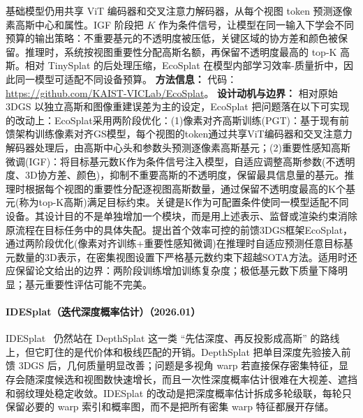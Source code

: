 基础模型仍用共享 ViT 编码器和交叉注意力解码器，从每个视图 token 预测逐像素高斯中心和属性。IGF 阶段把 $K$ 作为条件信号，让模型在同一输入下学会不同预算的输出策略：不重要基元的不透明度被压低，关键区域的协方差和颜色被保留。推理时，系统按视图重要性分配高斯名额，再保留不透明度最高的 top-K 高斯。相对 TinySplat 的后处理压缩，EcoSplat 在模型内部学习效率-质量折中，因此同一模型可适配不同设备预算。
\textbf{方法信息：} 代码：\url{https://github.com/KAIST-VICLab/EcoSplat}。
\textbf{设计动机与边界：} 相对原始 3DGS 以独立高斯和图像重建误差为主的设定，EcoSplat 把问题落在以下可实现的改动上：EcoSplat采用两阶段优化：(1)像素对齐高斯训练(PGT)：基于现有前馈架构训练像素对齐GS模型，每个视图的token通过共享ViT编码器和交叉注意力解码器处理后，由高斯中心头和参数头预测逐像素高斯基元；(2)重要性感知高斯微调(IGF)：将目标基元数K作为条件信号注入模型，自适应调整高斯参数(不透明度、3D协方差、颜色)，抑制不重要高斯的不透明度，保留最具信息量的基元。推理时根据每个视图的重要性分配逐视图高斯数量，通过保留不透明度最高的K个基元(称为top-K高斯)满足目标约束。关键是K作为可配置条件使同一模型适配不同设备。其设计目的不是单独增加一个模块，而是用上述表示、监督或渲染约束消除原流程在目标任务中的具体失配。提出首个效率可控的前馈3DGS框架EcoSplat，通过两阶段优化(像素对齐训练+重要性感知微调)在推理时自适应预测任意目标基元数量的3D表示，在密集视图设置下严格基元数约束下超越SOTA方法。适用时还应保留论文给出的边界：两阶段训练增加训练复杂度；极低基元数下质量下降明显；基元重要性评估可能不完美。
\paragraph{IDESplat（迭代深度概率估计）（2026.01）}
IDESplat~\cite{2601_03824} 仍然站在 DepthSplat 这一类 ``先估深度、再反投影成高斯'' 的路线上，但它盯住的是代价体和极线匹配的开销。DepthSplat 把单目深度先验接入前馈 3DGS 后，几何质量明显改善；问题是多视角 warp 若直接保存密集特征，显存会随深度候选和视图数快速增长，而且一次性深度概率估计很难在大视差、遮挡和弱纹理处稳定收敛。IDESplat 的改动是把深度概率估计拆成多轮级联，每轮只保留必要的 warp 索引和概率图，而不是把所有密集 warp 特征都展开存储。

